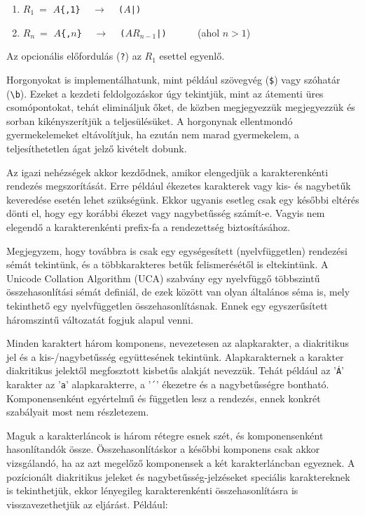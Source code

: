 \documentclass[
    parspace,
    noindent,
    nohyp,
]{elteiktdk}[2023/04/10]
\begin{document}
\begin{enumerate}
    \item $R_1~=$ \texttt{$A$\{,1\}} ~ $\longrightarrow$ ~ \texttt{($A$|)}
    \item $R_n~=$ \texttt{$A$\{,$n$\}} ~ $\longrightarrow$ ~ \texttt{($AR_{n-1}$|)} ~~~~~ (ahol $n>1$)
\end{enumerate}

Az opcionális előfordulás (\texttt{?}) az $R_1$ esettel egyenlő.

Horgonyokat is implementálhatunk,
mint például szövegvég (\texttt{\$}) vagy szóhatár (\texttt{{\textbackslash}b}).
Ezeket a kezdeti feldolgozáskor úgy tekintjük,
mint az átementi üres csomópontokat, tehát elimináljuk őket,
de közben megjegyezzük megjegyezzük és sorban kikényszerítjük a teljesülésüket.
A horgonynak ellentmondó gyermekelemeket eltávolítjuk,
ha ezután nem marad gyermekelem, a teljesíthetetlen ágat jelző kivételt dobunk.


Az igazi nehézségek akkor kezdődnek,
amikor elengedjük a karakterenkénti rendezés megszorítását.
Erre például ékezetes karakterek vagy kis- és nagybetűk keveredése esetén lehet szükségünk.
Ekkor ugyanis esetleg csak egy későbbi eltérés dönti el,
hogy egy korábbi ékezet vagy nagybetűsség számít-e.
Vagyis nem elegendő a karakterenkénti prefix-fa a rendezettség biztosításához.

Megjegyzem, hogy továbbra is csak egy egységesített (nyelvfüggetlen) rendezési sémát tekintünk,
és a többkarakteres betűk felismerésétől is eltekintünk.
A Unicode Collation Algorithm (UCA) szabvány egy nyelvfüggő többszintű összehasonlítási sémát definiál,
de ezek között van olyan általános séma is, mely tekinthető egy nyelvfüggetlen összehasonlításnak.
Ennek egy egyszerűsített háromszintű változatát fogjuk alapul venni.

Minden karaktert három komponens,
nevezetesen az alapkarakter, a diakritikus jel és a kis-/nagybetűsség együttesének tekintünk.
Alapkarakternek a karakter diakritikus jelektől megfosztott kisbetűs alakját nevezzük.
Tehát például az '\texttt{Á}' karakter az '\texttt{a}' alapkarakterre,
a '\texttt{´}' ékezetre és a nagybetűsségre bontható.
Komponensenként egyértelmű és független lesz a rendezés,
ennek konkrét szabályait most nem részletezem.

Maguk a karakterláncok is három rétegre esnek szét, és komponensenként hasonlítandók össze.
Összehasonlításkor a későbbi komponens csak akkor vizsgálandó,
ha az azt megelőző komponensek a két karakterláncban egyeznek.
A pozícionált diakritikus jeleket és nagybetűsség-jelzéseket speciális karaktereknek is tekinthetjük,
ekkor lényegileg karakterenkénti összehasonlításra is visszavezethetjük az eljárást.
Például:
\end{document}
